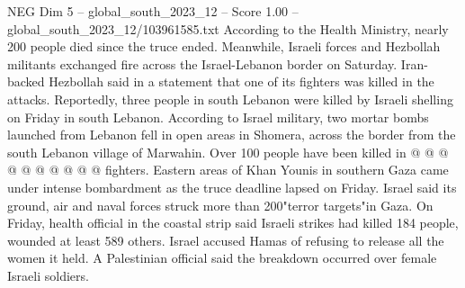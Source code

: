 \begin{textsample}{NEG Dim 5 – global\_south\_2023\_12 – Score 1.00 – global\_south\_2023\_12/103961585.txt}
According to the Health Ministry, nearly 200 people died since the truce ended.
Meanwhile, Israeli forces and Hezbollah militants exchanged fire across the Israel-Lebanon border on Saturday.
Iran-backed Hezbollah said in a statement that one of its fighters was killed in the attacks.
Reportedly, three people in south Lebanon were killed by Israeli shelling on Friday in south Lebanon.
According to Israel military, two mortar bombs launched from Lebanon fell in open areas in Shomera, across the border from the south Lebanon village of Marwahin.
Over 100 people have been killed in @ @ @ @ @ @ @ @ @ @ fighters.
Eastern areas of Khan Younis in southern Gaza came under intense bombardment as the truce deadline lapsed on Friday.
Israel said its ground, air and naval forces struck more than 200"terror targets"in Gaza.
On Friday, health official in the coastal strip said Israeli strikes had killed 184 people, wounded at least 589 others.
Israel accused Hamas of refusing to release all the women it held.
A Palestinian official said the breakdown occurred over female Israeli soldiers.

\end{textsample}
